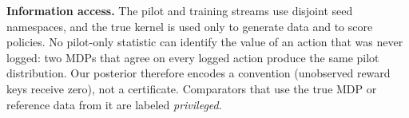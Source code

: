 \textbf{Information access.} The pilot and training streams use disjoint seed namespaces, and the true kernel is used only to generate data and to score policies. No pilot-only statistic can identify the value of an action that was never logged: two MDPs that agree on every logged action produce the same pilot distribution. Our posterior therefore encodes a convention (unobserved reward keys receive zero), not a certificate. Comparators that use the true MDP or reference data from it are labeled \emph{privileged}.
